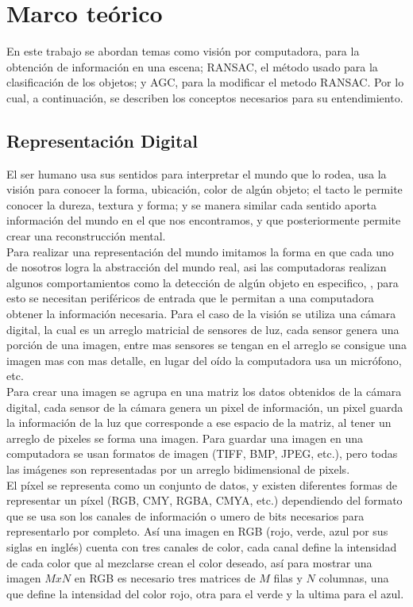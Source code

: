 \section{Marco teórico}

En este trabajo se abordan temas como visión por computadora, para la obtención de información en una escena;  RANSAC, el método usado para la clasificación de los objetos; y AGC, para la modificar el metodo RANSAC.  Por lo cual, a continuación, se describen los conceptos necesarios para su entendimiento.

\subsection{Representación Digital}

El ser humano usa sus sentidos para interpretar el mundo que lo rodea, usa la visión para conocer la forma, ubicación, color de algún objeto; el tacto le permite conocer la dureza, textura y forma; y se manera similar cada sentido aporta información del mundo en el que nos encontramos, y que posteriormente permite crear una reconstrucción mental.\\

Para realizar una representación del mundo imitamos la forma en que cada uno de nosotros logra la abstracción del mundo real, asi las computadoras realizan algunos comportamientos como la detección de algún objeto en especifico, , para esto se necesitan periféricos de entrada que le permitan a una computadora obtener la información necesaria. Para el caso de la visión se utiliza una cámara digital, la cual es un arreglo matricial de sensores de luz, cada sensor genera una porción de una imagen, entre mas sensores se tengan en el arreglo se consigue una imagen mas con mas detalle, en lugar del oído la computadora usa un micrófono, etc. \\

Para crear una imagen se agrupa en una matriz los datos obtenidos de la cámara digital, cada sensor de la cámara genera un pixel de información, un pixel guarda la información de la luz que corresponde a ese espacio de la matriz, al tener un arreglo de pixeles se forma una imagen.
Para guardar una imagen en una computadora se usan formatos de imagen (TIFF, BMP, JPEG, etc.), pero todas las imágenes son representadas por un arreglo bidimensional de \glspl{pixel}.\\

El  píxel se representa como un conjunto de datos, y existen diferentes formas de representar un píxel (RGB, CMY, RGBA, CMYA, etc.) dependiendo del formato que se usa son los canales de información o umero de bits necesarios para representarlo por completo. Así una imagen en RGB (rojo, verde, azul por sus siglas en inglés) cuenta con tres canales de color, cada canal define la intensidad de cada color que al mezclarse crean el color deseado, así para mostrar una imagen $MxN$ en RGB es necesario tres matrices de $M$ filas y $N$ columnas, una que define la intensidad del color rojo, otra para el verde y la ultima para el azul.\\

